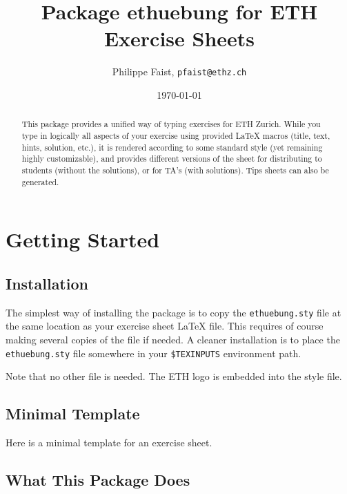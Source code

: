\documentclass[11pt,a4paper]{article}
\title{Package {\fontseries{m}\selectfont ethuebung} for ETH Exercise Sheets}
\author{Philippe Faist, \texttt{pfaist{@}ethz.ch}}
\date\today
\begin{document}
\maketitle

\renewcommand{\abstractname}{}
\setlength{\noteabstracttextwidth}{0.95\textwidth}
\renewcommand{\noteabstracttextfont}{\small}
\begin{abstract}
This package provides a unified way of typing exercises for ETH Zurich. While you type in
logically all aspects of your exercise using provided \LaTeX{} macros (title, text, hints,
solution, etc.), it is rendered according to some standard style (yet remaining highly
customizable), and provides different versions of the sheet for distributing to students
(without the solutions), or for TA's (with solutions). Tips sheets can also be generated.
\end{abstract}

{\small
\inlinetoc
}

\section{Getting Started}

\subsection{Installation}

The simplest way of installing the \ethuebung{} package is to copy the
\texttt{ethuebung.sty} file at the same location as your exercise sheet \LaTeX{} file. This
requires of course making several copies of the file if needed.
A cleaner installation is to place the \texttt{ethuebung.sty} file somewhere in your
\texttt{\$TEXINPUTS} environment path.

Note that no other file is needed. The ETH logo is embedded into the style file.


\subsection{Minimal Template}
\label{sec:minimaltemplate}

Here is a minimal template for an exercise sheet.

\begin{pkgverbatim}%
%
\end{pkgverbatim}


\subsection{What This Package Does}
\end{document}

